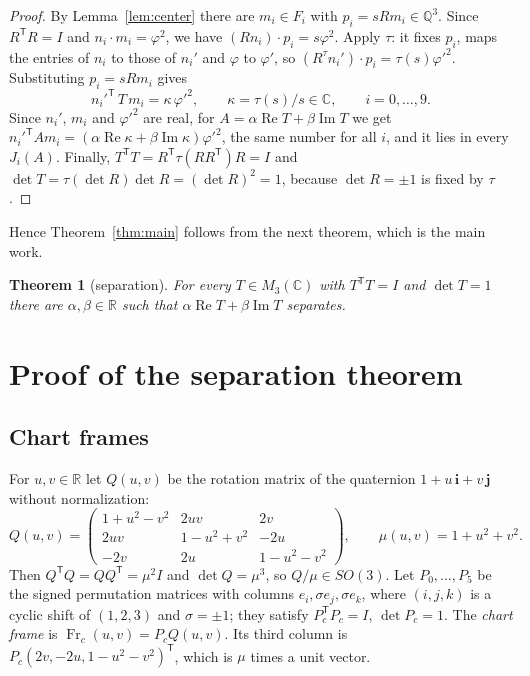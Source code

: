 \documentclass[11pt]{article}
\newtheorem{theorem}{Theorem}[section]
\theoremstyle{definition}
\theoremstyle{remark}
\newcommand{\R}{\mathbb{R}}
\newcommand{\Q}{\mathbb{Q}}
\newcommand{\C}{\mathbb{C}}
\newcommand{\Fr}{\operatorname{Fr}}
\newcommand{\re}{\operatorname{Re}}
\newcommand{\im}{\operatorname{Im}}
\newcommand{\T}{\mathsf T}
\begin{document}
\begin{proof}
By Lemma~\ref{lem:center} there are $m_i\in F_i$ with $p_i=sRm_i\in\Q^3$. Since $R^{\T}R=I$ and
$n_i\cdot m_i=\varphi^2$, we have $(Rn_i)\cdot p_i=s\varphi^2$. Apply $\tau$: it fixes $p_i$, maps the
entries of $n_i$ to those of $n_i'$ and $\varphi$ to $\varphi'$, so $(R^\tau n_i')\cdot p_i=\tau(s)\varphi'^2$.
Substituting $p_i=sRm_i$ gives
\[
  n_i'^{\T}\,T\,m_i=\kappa\,\varphi'^2,\qquad \kappa=\tau(s)/s\in\C,\qquad i=0,\dots,9.
\]
Since $n_i'$, $m_i$ and $\varphi'^2$ are real, for $A=\alpha\re T+\beta\im T$ we get
$n_i'^{\T}Am_i=(\alpha\re\kappa+\beta\im\kappa)\varphi'^2$, the same number for all $i$, and it lies in
every $J_i(A)$. Finally, $T^{\T}T=R^{\T}\tau(RR^{\T})R=I$ and $\det T=\tau(\det R)\det R=(\det R)^2=1$,
because $\det R=\pm1$ is fixed by $\tau$.
\end{proof}

Hence Theorem~\ref{thm:main} follows from the next theorem, which is the main work.

\begin{theorem}[separation]\label{thm:sep}
For every $T\in M_3(\C)$ with $T^{\T}T=I$ and $\det T=1$ there are $\alpha,\beta\in\R$ such that
$\alpha\re T+\beta\im T$ separates.
\end{theorem}

\section{Proof of the separation theorem}\label{sec:sep}

\subsection{Chart frames}
For $u,v\in\R$ let $Q(u,v)$ be the rotation matrix of the quaternion $1+u\,\mathbf i+v\,\mathbf j$
without normalization:
\[
  Q(u,v)=\begin{pmatrix}1+u^2-v^2&2uv&2v\\2uv&1-u^2+v^2&-2u\\-2v&2u&1-u^2-v^2\end{pmatrix},\qquad
  \mu(u,v)=1+u^2+v^2 .
\]
Then $Q^{\T}Q=QQ^{\T}=\mu^2I$ and $\det Q=\mu^3$, so $Q/\mu\in SO(3)$. Let $P_0,\dots,P_5$ be the
signed permutation matrices with columns $e_i,\sigma e_j,\sigma e_k$, where $(i,j,k)$ is a cyclic shift
of $(1,2,3)$ and $\sigma=\pm1$; they satisfy $P_c^{\T}P_c=I$, $\det P_c=1$. The \emph{chart frame} is
$\Fr_c(u,v)=P_cQ(u,v)$. Its third column is $P_c(2v,-2u,1-u^2-v^2)^{\T}$, which is $\mu$ times
a unit vector.
\end{document}
